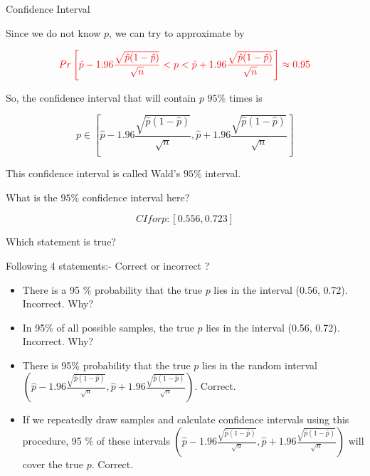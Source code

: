 \documentclass{beamer}\usepackage[]{graphicx}\usepackage[]{color}
\begin{document}
\begin{frame}{Confidence Interval}

Since we do not know $p$, we can try to approximate by 

$$ \textcolor{red}{Pr \left [ \hat{p} - 1.96 \frac{\sqrt{\hat{p}(1-\hat{p})}}{\sqrt{n}} < p < \hat{p} + 1.96 \frac{\sqrt{\hat{p}(1-\hat{p})}}{\sqrt{n}} \right] \approx 0.95} $$ \pause

So, the confidence interval that will contain $p$ $95 \%$ times is 

$$ p \in \left [ \hat{p} - 1.96 \frac{\sqrt{\hat{p}(1-\hat{p})}}{\sqrt{n}}, \hat{p} + 1.96 \frac{\sqrt{\hat{p}(1-\hat{p})}}{\sqrt{n}} \right ] $$ \pause 

This confidence interval is called Wald's $95 \%$ interval.  \pause \newline

What is the $95 \%$ confidence interval here? \pause \newline

$$ CI for p : \left [0.556, 0.723 \right] $$

\end{frame}

\begin{frame}{Which statement is true?}

 Following 4 statements:- Correct or incorrect ? \pause
    \begin{itemize}
    \item There is a 95 \% probability that the true $p$
      lies in the interval (0.56, 0.72). \pause Incorrect. \pause Why? \pause
    \item In 95\% of all possible samples, the true $p$
      lies in the interval (0.56, 0.72). \pause Incorrect. \pause Why? \pause

    \item There is 95\% probability that the true $p$ lies in the random interval $ \left(\hat{p} - 1.96 \frac{\sqrt{\hat{p}(1-\hat{p})}}{\sqrt{n}}, \hat{p} + 1.96 \frac{\sqrt{\hat{p}(1-\hat{p})}}{\sqrt{n}} \right )$. \pause Correct. \pause
    \item If we repeatedly draw samples and calculate confidence
      intervals using this procedure, 95 \% of these intervals $ \left(\hat{p} - 1.96 \frac{\sqrt{\hat{p}(1-\hat{p})}}{\sqrt{n}}, \hat{p} + 1.96 \frac{\sqrt{\hat{p}(1-\hat{p})}}{\sqrt{n}} \right )$ will cover the true $p$. \pause Correct.
\end{itemize}

\end{frame}
\end{document}
